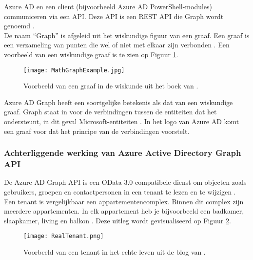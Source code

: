 Azure \ac{AD} en een client (bijvoorbeeld Azure \ac{AD} PowerShell-modules) communiceren via een \ac{API}. Deze \ac{API} is een \ac{REST} \ac{API} die Graph wordt genoemd \autocite{Microsoft2015}. \\ 

De naam “Graph” is afgeleid uit het wiskundige figuur van een graaf. Een graaf is een verzameling van punten die wel of niet met elkaar zijn verbonden \autocite{Denaux2022}. Een voorbeeld van een wiskundige graaf is te zien op Figuur \ref{mga}. \\

\begin{figure}[h!]
    \texttt{[image: MathGraphExample.jpg]}
    \caption[Voorbeeld wiskundige graaf]{Voorbeeld van een graaf in de wiskunde uit het boek van \textcite{Diestel2010}.}
    \label{mga}
\end{figure}

Azure \ac{AD} Graph heeft een soortgelijke betekenis als dat van een wiskundige graaf. Graph staat in voor de verbindingen tussen de entiteiten dat het ondersteunt, in dit geval Microsoft-entiteiten \autocite{Kokkarinen2022}. In het logo van \textcite{Microsoftb} Azure \ac{AD} komt een graaf voor dat het principe van de verbindingen voorstelt. \\


\subsubsection{Achterliggende werking van Azure Active Directory Graph API}


De Azure \ac{AD} Graph \ac{API} is een OData 3.0-compatibele dienst om objecten zoals gebruikers, groepen en contactpersonen in een tenant te lezen en te wijzigen \autocite{Microsoft2016}. \\

Een tenant is vergelijkbaar een appartementencomplex. Binnen dit complex zijn meerdere appartementen. In elk appartement heb je bijvoorbeeld een badkamer, slaapkamer, living en balkon \autocite{Saxton2015}. Deze uitleg wordt gevisualiseerd op Figuur \ref{rlt}. \\

\begin{figure}[!h]
    \texttt{[image: RealTenant.png]}
    \caption[Voorbeeld werkelijke tenant]{Voorbeeld van een tenant in het echte leven uit de blog van \textcite{Saxton2015}.}
    \label{rlt}
\end{figure}

